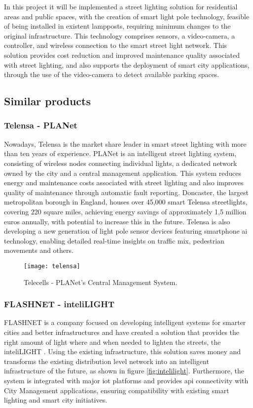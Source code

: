 In this project it will be implemented a street lighting solution for residential areas and public spaces, with the creation of smart light pole technology, feasible of being installed in existent lampposts, requiring minimum changes to the original infrastructure. This technology comprises sensors, a video-camera, a controller, and wireless connection to the smart street light network. This solution provides cost reduction and improved maintenance quality associated with street lighting, and also supports the deployment of smart city applications, through the use of the video-camera to detect available parking spaces.

\subsection{Similar products}

\subsubsection{Telensa - PLANet}

Nowadays, Telensa is the market share leader in smart street lighting with more than ten years of experience.\cite{telensa} PLANet is an intelligent street lighting system, consisting of wireless nodes connecting individual lights, a dedicated network owned by the city and a central management application. This system reduces energy and maintenance costs associated with street lighting and also improves quality of maintenance through automatic fault reporting. Doncaster, the largest metropolitan borough in England, houses over 45,000 smart Telensa streetlights, covering 220 square miles, achieving energy savings of approximately 1,5 million euros annually, with potential to increase this in the future. Telensa is also developing a new generation of light pole sensor devices featuring smartphone \ac{ai} technology, enabling detailed real-time insights on traffic mix, pedestrian movements and others.

\begin{figure}[ht]
	\centering
	\texttt{[image: telensa]}
	\caption{Telecells - PLANet's Central Management System.}
	\label{fig:telensa}
\end{figure}


\subsubsection{FLASHNET - inteliLIGHT}
FLASHNET is a company focused on developing intelligent systems for smarter cities and better infrastructures and have created a solution that provides the right amount of light where and when needed to lighten the streets, the inteliLIGHT \cite{inteli_light}. Using the existing infrastructure, this solution saves money and transforms the existing distribution level network into an intelligent infrastructure of the future, as shown in figure \ref{fig:intelilight}. Furthermore, the system is integrated with major \ac{iot} platforms and provides \ac{api} connectivity with City Management applications, ensuring compatibility with existing smart lighting and smart city initiatives.

